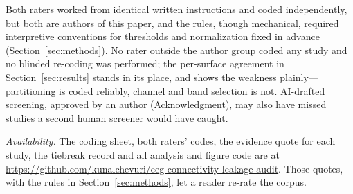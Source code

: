 Both raters worked from identical written instructions and coded independently, but both are authors of this paper, and the rules, though mechanical, required interpretive conventions for thresholds and normalization fixed in advance (Section~\ref{sec:methods}). No rater outside the author group coded any study and no blinded re-coding was performed; the per-surface agreement in Section~\ref{sec:results} stands in its place, and shows the weakness plainly---partitioning is coded reliably, channel and band selection is not. AI-drafted screening, approved by an author (Acknowledgment), may also have missed studies a second human screener would have caught.

\emph{Availability.} The coding sheet, both raters' codes, the evidence quote for each study, the tiebreak record and all analysis and figure code are at \url{https://github.com/kunalchevuri/eeg-connectivity-leakage-audit}. Those quotes, with the rules in Section~\ref{sec:methods}, let a reader re-rate the corpus.
